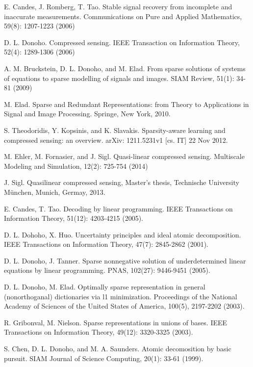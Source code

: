 \documentclass[smallextended]{svjour3}
\begin{document}
\begin{thebibliography}{}

E. Candes, J. Romberg, T. Tao. Stable signal recovery from incomplete and inaccurate measurements.
Communications on Pure and Applied Mathematics, 59(8): 1207-1223 (2006)

D. L. Donoho. Compressed sensing. IEEE Transaction on Information Theory, 52(4): 1289-1306 (2006)

A. M. Bruckstein, D. L. Donoho, and M. Elad. From sparse solutions of systems of equations to sparse modelling
of signals and images. SIAM Review, 51(1): 34-81 (2009)

M. Elad. Sparse and Redundant Representations: from Theory to Applications in Signal and Image Processing. Springe, New York, 2010.

S. Theodoridis, Y. Kopsinis, and K. Slavakis. Sparsity-aware learning and compressed sensing: an overview.
arXiv: 1211.5231v1 [cs. IT] 22 Nov 2012.

M. Ehler, M. Fornasier, and J. Sigl. Quasi-linear compressed sensing. Multiscale Modeling and Simulation, 12(2): 725-754 (2014)

J. Sigl. Quasilinear compressed sensing, Master's thesis, Technische University M\"{u}nchen, Munich, Germay, 2013.

E. Candes, T. Tao. Decoding by linear programming. IEEE Transactions on Information Theory, 51(12): 4203-4215 (2005).

D. L. Dohoho, X. Huo. Uncertainty principles and ideal atomic decomposition. IEEE Transactions on Information Theory, 47(7): 2845-2862 (2001).

D. L. Donoho, J. Tanner. Sparse nonnegative solution of underdetermined linear equations by linear programming. PNAS, 102(27): 9446-9451 (2005).

D. L. Donoho, M. Elad. Optimally sparse representation in general (nonorthoganal) dictionaries via l1 minimization. Proceedings of the National Academy of Sciences of the United States of America, 100(5), 2197-2202 (2003).

R. Gribonval, M. Nielson. Sparse representations in unions of bases. IEEE Transactions on Information Theory, 49(12): 3320-3325 (2003).

S. Chen, D. L. Donoho, and M. A. Saunders. Atomic decomosition by basic pursuit. SIAM Journal of Science Computing, 20(1): 33-61 (1999).


\end{thebibliography}
\end{document}
